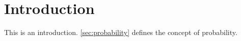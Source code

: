 \chapter{Introduction} \label{sec:introduction}
This is an introduction.
\cref{sec:probability} defines the concept of probability.

